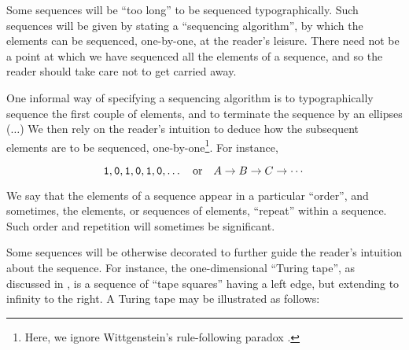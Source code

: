 Some sequences will be ``too long'' to be sequenced typographically. Such
sequences will be given by stating a ``sequencing algorithm'', by which the
elements can be sequenced, one-by-one, at the reader's leisure. There need not
be a point at which we have sequenced all the elements of a sequence, and so
the reader should take care not to get carried away.

One informal way of specifying a sequencing algorithm is to typographically
sequence the first couple of elements, and to terminate the sequence by an
ellipses ($\ldots$) We then rely on the reader's intuition to deduce how the
subsequent elements are to be sequenced, one-by-one\footnote{Here, we ignore
Wittgenstein's rule-following paradox \cite[\textsection~201, p.
69]{wittgenstein-1953}.}. For instance,

$$\mathtt{1},\mathtt{0},\mathtt{1},\mathtt{0},\mathtt{1},\mathtt{0},\ldots \quad \text{or} \quad
A\rightarrow B \rightarrow C\rightarrow\cdots$$

We say that the elements of a sequence appear in a particular ``order'', and
sometimes, the elements, or sequences of elements, ``repeat'' within a
sequence. Such order and repetition will sometimes be significant.

Some sequences will be otherwise decorated to further guide the reader's
intuition about the sequence. For instance, the one-dimensional ``Turing
tape'', as discussed in , is a sequence of
``tape squares'' having a left edge, but extending to infinity to the right.  A
Turing tape may be illustrated as follows:
 
\begin{center}
\end{center}

